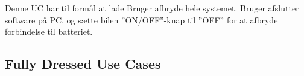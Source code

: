 Denne UC har til formål at lade Bruger afbryde hele systemet. Bruger afslutter software på PC, og sætte bilen ''ON/OFF''-knap til ''OFF'' for at afbryde forbindelse til batteriet. 
\clearpage


\subsection{Fully Dressed Use Cases}


\clearpage


\clearpage


\clearpage


\clearpage


\clearpage


\clearpage


\clearpage


\clearpage


\clearpage


\clearpage


\clearpage


\clearpage